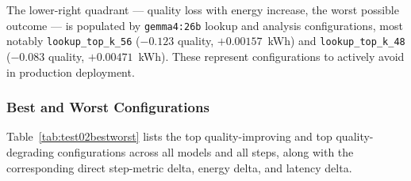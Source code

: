 The lower-right quadrant — quality loss with energy increase, the worst
possible outcome — is populated by \texttt{gemma4:26b} lookup and
analysis configurations, most notably \texttt{lookup\_top\_k\_56}
($-0.123$ quality, $+0.00157$~kWh) and
\texttt{lookup\_top\_k\_48} ($-0.083$ quality, $+0.00471$~kWh).
These represent configurations to actively avoid in production deployment.

\subsubsection{Best and Worst Configurations}

Table~\ref{tab:test02bestworst} lists the top quality-improving and
top quality-degrading configurations across all models and all steps,
along with the corresponding direct step-metric delta, energy delta,
and latency delta.

